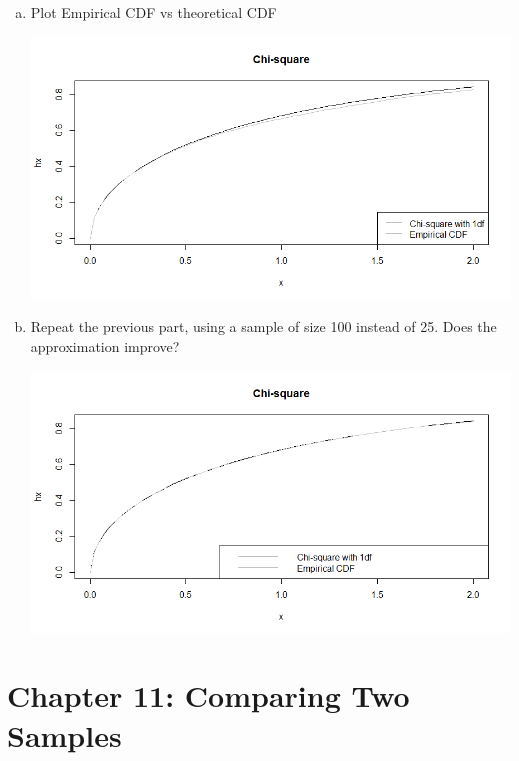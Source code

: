 \documentclass{article}
\begin{document}
\begin{itemize}
\begin{enumerate}[(a)]
			\item Plot Empirical CDF vs theoretical CDF
				\begin{center}
					\includegraphics[width=15cm]{chi-square-emp.png}
				\end{center}

			\item Repeat the previous part, using a sample of size 100 instead of 25. Does the approximation improve?
				\begin{center}
					\includegraphics[width=15cm]{chi-square-emp-100.png}
				\end{center}	
				
		\end{enumerate}
\end{itemize}
\newpage

\section*{Chapter 11: Comparing Two Samples}
\end{document}
